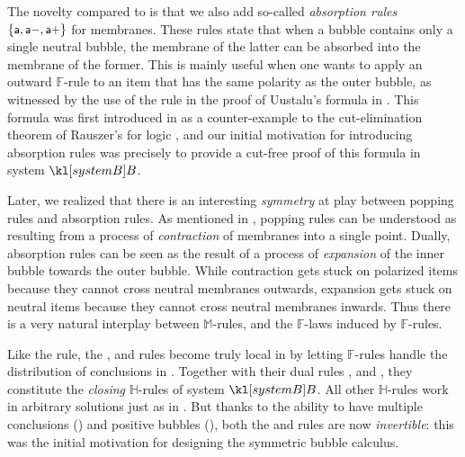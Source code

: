 \begin{description}
  The novelty compared to  is that we also add so-called
  \emph{absorption rules} $\{\text{\small$\mathsf{a}$},\text{\small$\mathsf{a{-}}$},\text{\small$\mathsf{a{+}}$}\}$ for membranes.
  These rules state that when a bubble contains only a single neutral bubble,
  the membrane of the latter can be absorbed into the membrane of the former.
  This is mainly useful when one wants to apply an outward $\mathbb{F}$-rule to
  an item that has the same polarity as the outer bubble, as witnessed by the
  use of the  rule in the proof of Uustalu's formula in
  . This formula was first introduced in
   as a counter-example to the cut-elimination
  theorem of Rauszer's  for  logic
  , and our initial motivation for
  introducing absorption rules was precisely to provide a cut-free proof of this
  formula in system $\sysB$.

  Later, we realized that there is an interesting \emph{symmetry} at play
  between popping rules and absorption rules. As mentioned in
  , popping rules can be understood as resulting from a
  process of \emph{contraction} of membranes into a single point. Dually,
  absorption rules can be seen as the result of a process of \emph{expansion} of
  the inner bubble towards the outer bubble. While contraction gets stuck on
  polarized items because they cannot cross neutral membranes outwards,
  expansion gets stuck on neutral items because they cannot cross neutral
  membranes inwards. Thus there is a very natural interplay between
  $\mathbb{M}$-rules, and the $\mathbb{F}$-laws induced by $\mathbb{F}$-rules.

  \item[\textbf{\heating}] 
  Like the  rule, the \rsf{\bot{-}}, \rsf{\lor{-}} and
  \rsf{{\limp}{-}} rules become truly local in  by letting
  $\mathbb{F}$-rules handle the distribution of conclusions in .
  Together with their dual rules \rsf{\top{+}}, \rsf{\land{+}} and
  \rsf{{\limp}{+}}, they constitute the \emph{closing} $\mathbb{H}$-rules of
  system $\sysB$. All other $\mathbb{H}$-rules work in arbitrary solutions just
  as in . But thanks to the ability to have multiple conclusions
  () and positive bubbles (), both the
  \rsf{\lor{+}} and \rsf{{\limp}{+}} rules are now \emph{invertible}: this was
  the initial motivation for designing the symmetric bubble calculus.
\end{description}